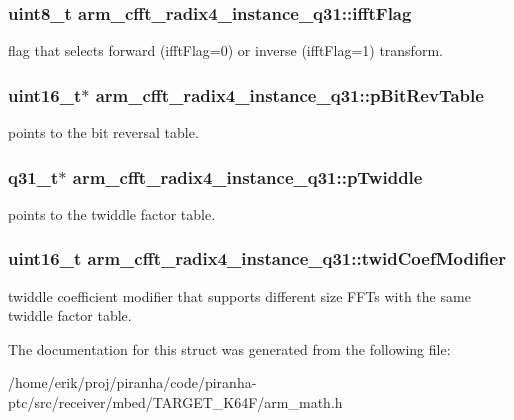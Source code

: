 \subsubsection[{\texorpdfstring{ifft\+Flag}{ifftFlag}}]{\setlength{\rightskip}{0pt plus 5cm}uint8\+\_\+t arm\+\_\+cfft\+\_\+radix4\+\_\+instance\+\_\+q31\+::ifft\+Flag}\hypertarget{structarm__cfft__radix4__instance__q31_adc0a62ba669ad2282ecbe43d5d96abab}{}\label{structarm__cfft__radix4__instance__q31_adc0a62ba669ad2282ecbe43d5d96abab}
flag that selects forward (ifft\+Flag=0) or inverse (ifft\+Flag=1) transform. 
\subsubsection[{\texorpdfstring{p\+Bit\+Rev\+Table}{pBitRevTable}}]{\setlength{\rightskip}{0pt plus 5cm}uint16\+\_\+t$\ast$ arm\+\_\+cfft\+\_\+radix4\+\_\+instance\+\_\+q31\+::p\+Bit\+Rev\+Table}\hypertarget{structarm__cfft__radix4__instance__q31_a33a3bc774c97373261699463c05dfe54}{}\label{structarm__cfft__radix4__instance__q31_a33a3bc774c97373261699463c05dfe54}
points to the bit reversal table. 
\subsubsection[{\texorpdfstring{p\+Twiddle}{pTwiddle}}]{\setlength{\rightskip}{0pt plus 5cm}q31\+\_\+t$\ast$ arm\+\_\+cfft\+\_\+radix4\+\_\+instance\+\_\+q31\+::p\+Twiddle}\hypertarget{structarm__cfft__radix4__instance__q31_a561c22dee4cbdcfa0fd5f15106ecc306}{}\label{structarm__cfft__radix4__instance__q31_a561c22dee4cbdcfa0fd5f15106ecc306}
points to the twiddle factor table. 
\subsubsection[{\texorpdfstring{twid\+Coef\+Modifier}{twidCoefModifier}}]{\setlength{\rightskip}{0pt plus 5cm}uint16\+\_\+t arm\+\_\+cfft\+\_\+radix4\+\_\+instance\+\_\+q31\+::twid\+Coef\+Modifier}\hypertarget{structarm__cfft__radix4__instance__q31_a8cf8187b8232815cf17ee82bf572ecf9}{}\label{structarm__cfft__radix4__instance__q31_a8cf8187b8232815cf17ee82bf572ecf9}
twiddle coefficient modifier that supports different size F\+F\+Ts with the same twiddle factor table. 

The documentation for this struct was generated from the following file\+:\begin{DoxyCompactItemize}
\item 
/home/erik/proj/piranha/code/piranha-\/ptc/src/receiver/mbed/\+T\+A\+R\+G\+E\+T\+\_\+\+K64\+F/arm\+\_\+math.\+h\end{DoxyCompactItemize}
